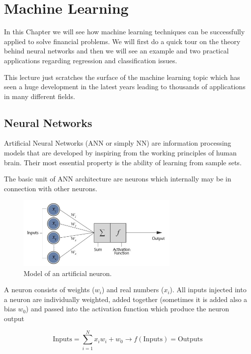 \chapter{Machine Learning}\label{neural-network---practical-lesson-8}

In this Chapter we will see how machine learning techniques can be
successfully applied to solve financial problems. We will first do a
quick tour on the theory behind neural networks and then we will see an
example and two practical applications regarding regression and
classification issues.

This lecture just scratches the surface of the
machine learning topic which has seen a huge development in the latest
years leading to thousands of applications in many different fields.
    
\section{Neural Networks}\label{neural-networks}

Artificial Neural Networks (ANN or simply NN) are information processing
models that are developed by inspiring from the working principles of
human brain. Their most essential property is the ability of learning
from sample sets.

The basic unit of ANN architecture are neurons which internally may be in
connection with other neurons.

\begin{figure}[htb]
	\centering
	\includegraphics[width=0.7\textwidth]{figures/neuron}
	\caption{Model of an artificial neuron.}
\end{figure}

A neuron consists of weights (\(w_i\)) and real numbers (\(x_i\)). All
inputs injected into a neuron are individually weighted, added together
(sometimes it is added also a bias \(w_0\)) and passed into the
activation function which produce the neuron output

\[ \textrm{Inputs} = \sum_{i=1}^{N} x_i w_i +w_0 \rightarrow f(\textrm{Inputs}) = \textrm{Outputs}\]

